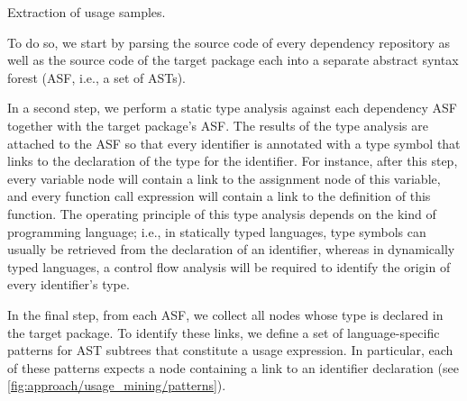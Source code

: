 \begin{algorithm}[b]
	\caption{Extraction of usage samples.}\label{alg:usage_mining}

	\;
\end{algorithm}

To do so, we start by parsing the source code of every dependency repository as well as the source code of the target package each into a separate abstract syntax forest (ASF, i.e., a set of ASTs).

In a second step, we perform a static type analysis against each dependency ASF together with the target package's ASF.
The results of the type analysis are attached to the ASF so that every identifier is annotated with a type symbol that links to the declaration of the type for the identifier.
For instance, after this step, every variable node will contain a link to the assignment node of this variable, and every function call expression will contain a link to the definition of this function.
The operating principle of this type analysis depends on the kind of programming language; i.e., in statically typed languages, type symbols can usually be retrieved from the declaration of an identifier, whereas in dynamically typed languages, a control flow analysis will be required to identify the origin of every identifier's type.

In the final step, from each ASF, we collect all nodes whose type is declared in the target package.
To identify these links, we define a set of language-specific patterns for AST subtrees that constitute a usage expression.
In particular, each of these patterns expects a node containing a link to an identifier declaration (see \cref{fig:approach/usage_mining/patterns}).
